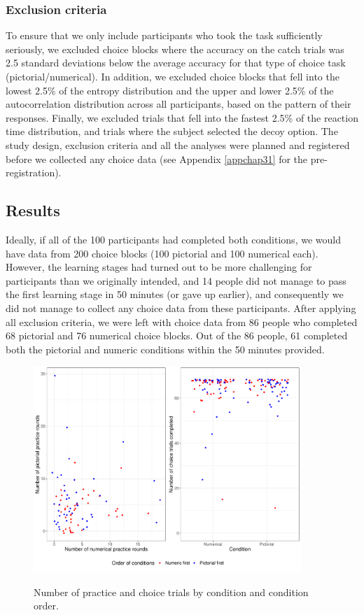 \documentclass[11pt,a4paper]{article}
\begin{document}
\subsubsection{Exclusion criteria}

To ensure that we only include participants who took the task sufficiently seriously, we excluded choice blocks where the accuracy on the catch trials was 2.5 standard deviations below the average accuracy for that type of choice task (pictorial/numerical). In addition, we excluded choice blocks that fell into the lowest 2.5\% of the entropy distribution
and the upper and lower 2.5\% of the autocorrelation distribution across all participants, based on the pattern of their responses. Finally, we excluded trials that fell into the fastest 2.5\% of
the reaction time distribution, and trials where the subject selected the decoy option.
The study design, exclusion criteria and all the analyses were planned and
registered before we collected any choice data (see Appendix \ref{appchap31} for the pre-registration).

\subsection{Results}

Ideally, if all of the 100 participants had completed both conditions, we would have data from 200 choice blocks (100 pictorial and 100 numerical each). However, the learning stages had turned out to be more challenging for participants than we originally intended, and 14 people did not manage to pass the first learning stage in 50 minutes (or gave up earlier), and consequently we did not manage to collect any choice data from these participants. After applying all exclusion criteria, we were left with choice data from 86 people who completed 68 pictorial and 76 numerical choice blocks. Out of the 86 people, 61 completed both the pictorial and numeric conditions within the 50 minutes provided.

\begin{figure}
\centering
\caption{Number of practice and choice trials by condition and condition order.}
\includegraphics[width=0.9\textwidth]{./Explor_teapot.pdf}
\label{fig:Explor_teapot}
\end{figure}
\end{document}
